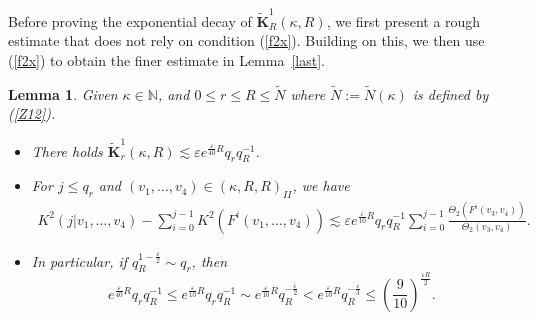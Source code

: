 \documentclass{amsart}
\newcounter{item}[section]
\newtheorem{Lemma}[Definition]{Lemma}
\theoremstyle{definition}
\begin{document}
Before proving the exponential decay of $\widetilde{\mathbf{K}}_R^1(\kappa,R)$, we first present a rough estimate that does not rely on condition (\ref{f2x}). Building on this, we then use (\ref{f2x}) to obtain the finer estimate in Lemma~\ref{last}.
\begin{Lemma}\label{keyy1}
Given $\kappa\in\mathbb{N}$, and $0\leq r\leq R\leq \tilde{N}$ where  $\tilde{N}:=\tilde{N}(\kappa)$ is defined by (\ref{Z12}).
\begin{itemize}
	\item [(1)] There holds $\widetilde{\mathbf{K}}_r^1(\kappa,R)\lesssim \varepsilon e^{\frac{\varepsilon}{40}R}q_rq_R^{-1}$.
	\item [(2)] For $j\leq q_r$ and $(v_1,\ldots,v_4)\in (\kappa,R,R)_{II}$, we have
	\begin{align*}
		K^2(j|v_1,\ldots,v_4)-\sum_{i=0}^{j-1}K^2(F^i(v_1,\ldots,v_4))
		\lesssim \varepsilon e^{\frac{\varepsilon}{10}R}q_rq_R^{-1}\sum_{i=0}^{j-1}\frac{\Theta_2(F^i(v_3,v_4))}{\Theta_2(v_3,v_4)}.
	\end{align*}
	\item [(3)] In particular, if $q_R^{1-\frac{\varepsilon}{2}}\sim q_r$, then
	\begin{equation}\label{eeps}
	e^{\frac{\varepsilon}{40}R}q_rq_R^{-1}\leq e^{\frac{\varepsilon}{10}R}q_rq_R^{-1}\sim e^{\frac{\varepsilon}{10}R}q_R^{-\frac{\varepsilon}{2}}<e^{\frac{\varepsilon}{10}R}q_R^{-\frac{\varepsilon}{3}}\leq (\frac{9}{10})^{\frac{\varepsilon R}{2}}.
	\end{equation}
\end{itemize}
\end{Lemma}
\end{document}
